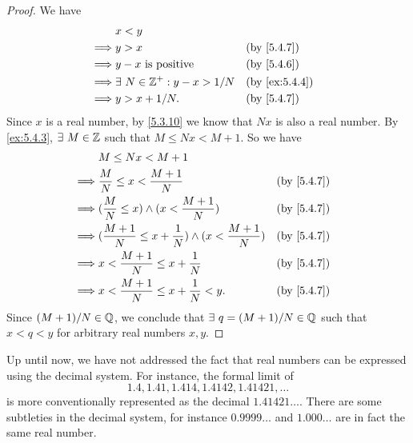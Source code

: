 \begin{proof}
  We have
  \begin{align*}
             & x < y                                                                \\
    \implies & y > x                               &  & \by{5.4.7}                  \\
    \implies & y - x \text{ is positive}           &  & \by{5.4.6}                  \\
    \implies & \exists\ N \in \Z^+ : y - x > 1 / N &  & \text{(by \cref{ex:5.4.4})} \\
    \implies & y > x + 1 / N.                      &  & \by{5.4.7}                  \\
  \end{align*}
  Since \(x\) is a real number, by \cref{5.3.10} we know that \(Nx\) is also a real number.
  By \cref{ex:5.4.3}, \(\exists\ M \in \mathbb{Z}\) such that \(M \leq Nx < M + 1\).
  So we have
  \begin{align*}
             & M \leq Nx < M + 1                                                                     \\
    \implies & \dfrac{M}{N} \leq x < \dfrac{M + 1}{N}                                &  & \by{5.4.7} \\
    \implies & (\dfrac{M}{N} \leq x) \land (x < \dfrac{M + 1}{N})                    &  & \by{5.4.7} \\
    \implies & (\dfrac{M + 1}{N} \leq x + \dfrac{1}{N}) \land (x < \dfrac{M + 1}{N}) &  & \by{5.4.7} \\
    \implies & x < \dfrac{M + 1}{N} \leq x + \dfrac{1}{N}                            &  & \by{5.4.7} \\
    \implies & x < \dfrac{M + 1}{N} \leq x + \dfrac{1}{N} < y.                       &  & \by{5.4.7}
  \end{align*}
  Since \((M + 1) / N \in \mathbb{Q}\), we conclude that \(\exists\ q = (M + 1) / N \in \mathbb{Q}\) such that \(x < q < y\) for arbitrary real numbers \(x, y\).
\end{proof}

\begin{rmk}\label{5.4.15}
  Up until now, we have not addressed the fact that real numbers can be expressed using the decimal system.
  For instance, the formal limit of
  \[
    1.4, 1.41, 1.414, 1.4142, 1.41421, \dots
  \]
  is more conventionally represented as the decimal \(1.41421\dots\).
  There are some subtleties in the decimal system, for instance \(0.9999\dots\) and \(1.000\dots\) are in fact the same real number.
\end{rmk}

